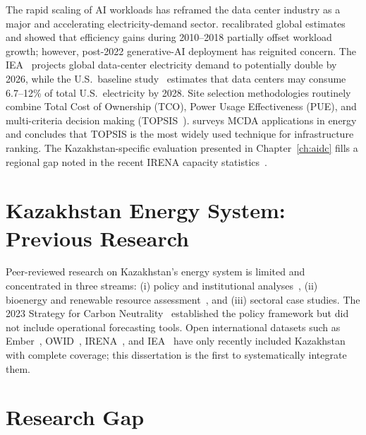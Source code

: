 The rapid scaling of AI workloads has reframed the data center industry as a major and accelerating electricity-demand sector. \cite{masanet2020} recalibrated global estimates and showed that efficiency gains during 2010--2018 partially offset workload growth; however, post-2022 generative-AI deployment has reignited concern. The IEA~\cite{iea2024dc} projects global data-center electricity demand to potentially double by 2026, while the U.S.\ baseline study~\cite{shehabi2024} estimates that data centers may consume 6.7--12\% of total U.S.\ electricity by 2028. Site selection methodologies routinely combine Total Cost of Ownership (TCO), Power Usage Effectiveness (PUE), and multi-criteria decision making (TOPSIS~\cite{hwang1981, behzadian2012}). \cite{mardani2017} surveys MCDA applications in energy and concludes that TOPSIS is the most widely used technique for infrastructure ranking. The Kazakhstan-specific evaluation presented in Chapter~\ref{ch:aidc} fills a regional gap noted in the recent IRENA capacity statistics~\cite{irena2024}.

\section{Kazakhstan Energy System: Previous Research}
\label{sec:lit_kz}

Peer-reviewed research on Kazakhstan's energy system is limited and concentrated in three streams: (i) policy and institutional analyses~\cite{karatayev2017, boute2019}, (ii) bioenergy and renewable resource assessment~\cite{koshim2018}, and (iii) sectoral case studies. The 2023 Strategy for Carbon Neutrality~\cite{moe2023strategy} established the policy framework but did not include operational forecasting tools. Open international datasets such as Ember~\cite{ember2024}, OWID~\cite{owid2024}, IRENA~\cite{irena2024}, and IEA~\cite{iea2024electricity} have only recently included Kazakhstan with complete coverage; this dissertation is the first to systematically integrate them.

\section{Research Gap}
\label{sec:lit_gap}

